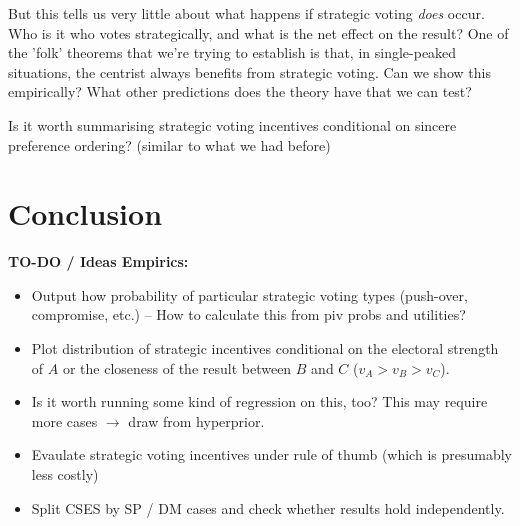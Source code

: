 \documentclass[11pt, letter, margin = 2 in]{article}
\begin{document}
But this tells us very little about what happens if strategic voting \textit{does} occur. Who is it who votes strategically, and what is the net effect on the result? One of the 'folk' theorems that we're trying to establish is that, in single-peaked situations, the centrist always benefits from strategic voting. Can we show this empirically? What other predictions does the theory have that we can test? 

Is it worth summarising strategic voting incentives conditional on sincere preference ordering? (similar to what we had before)

\section{Conclusion}

\textbf{TO-DO / Ideas Empirics:}

\begin{itemize}
\item Output how probability of particular strategic voting types (push-over, compromise, etc.) -- How to calculate this from piv probs and utilities?
\item Plot distribution of strategic incentives conditional on the electoral strength of $A$ or the closeness of the result between $B$ and $C$ ($v_A > v_B > v_C$).
\item Is it worth running some kind of regression on this, too? This may require more cases $\rightarrow$ draw from hyperprior.
\item Evaulate strategic voting incentives under rule of thumb (which is presumably less costly)
\item Split CSES by SP / DM cases and check whether results hold independently.

\end{itemize}
\end{document}
